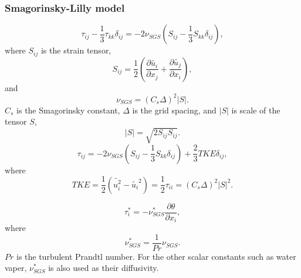 \subsubsection{Smagorinsky-Lilly model}
\begin{equation}
  \tau_{ij} - \frac{1}{3}\tau_{kk}\delta_{ij} = -2\nu_{SGS}\left(S_{ij}-\frac{1}{3}S_{kk}\delta_{ij}\right),
\end{equation}
where $S_{ij}$ is the strain tensor,
\begin{equation}
  S_{ij} = \frac{1}{2}\left(\frac{\partial \widetilde{u_i}}{\partial x_j} + \frac{\partial \widetilde{u_j}}{\partial x_i}\right),
\end{equation}
and
\begin{equation}
  \nu_{SGS} = \left(C_s\Delta\right)^2 \left|S\right|.
\end{equation}
$C_s$ is the Smagorinsky constant,
$\Delta$ is the grid spacing,
and $\left|S\right|$ is scale of the tensor $S$,
\begin{equation}
  \left|S\right| = \sqrt{2S_{ij}S_{ij}}.
\end{equation}
\begin{equation}
  \tau_{ij} = -2\nu_{SGS}\left(S_{ij}-\frac{1}{3}S_{kk}\delta_{ij}\right)
             + \frac{2}{3} TKE\delta_{ij},
\end{equation}
where
\begin{equation}
  TKE = \frac{1}{2}\left(\widetilde{u_i^2} - \widetilde{u_i}^2\right)
   = \frac{1}{2}\tau_{ii}
   = \left(C_s\Delta\right)^2\left|S\right|^2.
\end{equation}


\begin{equation}
  \tau^*_i = -\nu^*_{SGS} \frac{\partial \theta}{\partial x_i},
\end{equation}
where
\begin{equation}
  \nu^*_{SGS} = \frac{1}{Pr}\nu_{SGS}.
\end{equation}
$Pr$ is the turbulent Prandtl number.
For the other scalar constants such as water vaper,
$\nu^*_{SGS}$ is also used as their diffusivity.

